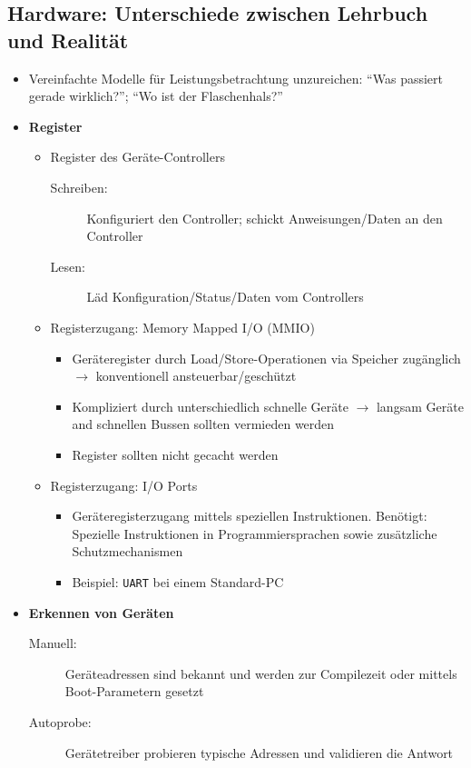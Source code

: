 \subsection{Hardware: Unterschiede zwischen Lehrbuch und Realität}
\begin{itemize}
	\item Vereinfachte Modelle für Leistungsbetrachtung unzureichen: "`Was passiert gerade wirklich?"'; "`Wo ist der Flaschenhals?"'
	\item \textbf{Register}
	\begin{itemize}
		\item Register des Geräte-Controllers
		\begin{description}
			\item[Schreiben:] Konfiguriert den Controller; schickt Anweisungen/Daten an den Controller
			\item[Lesen:] Läd Konfiguration/Status/Daten vom Controllers
		\end{description}
		\item Registerzugang: Memory Mapped I/O (MMIO)
		\begin{itemize}
			\item Geräteregister durch Load/Store-Operationen via Speicher zugänglich \(\rightarrow\) konventionell ansteuerbar/geschützt
			\item Kompliziert durch unterschiedlich schnelle Geräte \(\rightarrow\) langsam Geräte and schnellen Bussen sollten vermieden werden
			\item Register sollten nicht gecacht werden
		\end{itemize}
		\item Registerzugang: I/O Ports
		\begin{itemize}
			\item Geräteregisterzugang mittels speziellen Instruktionen. Benötigt: Spezielle Instruktionen in Programmiersprachen sowie zusätzliche Schutzmechanismen
			\item Beispiel: \texttt{UART} bei einem Standard-PC
		\end{itemize}
	\end{itemize}
	\item \textbf{Erkennen von Geräten}
	\begin{description}
		\item[Manuell:] Geräteadressen sind bekannt und werden zur Compilezeit oder mittels Boot-Parametern gesetzt
		\item[Autoprobe:] Gerätetreiber probieren typische Adressen und validieren die Antwort
	\end{description}
\end{itemize}

